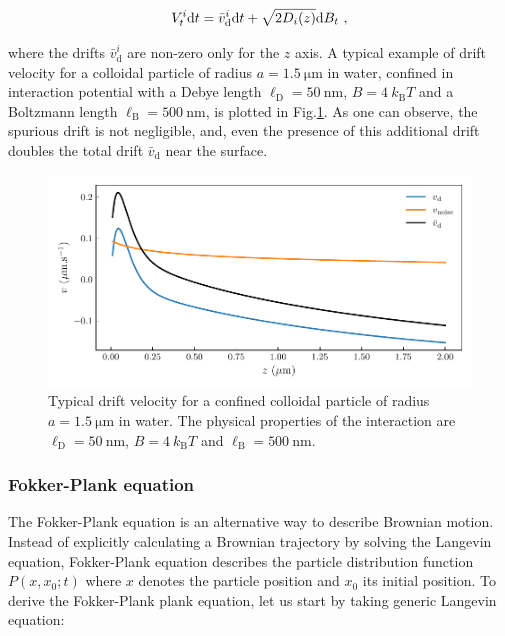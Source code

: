 \begin{equation}
		V_t^i \textnormal{d}t  = \bar{v}_\mathrm{d} ^i \textnormal{d}t + \sqrt{2D_i (z)}  \textnormal{d}B_t ~,
		\label{Eq.langevin_confined}
\end{equation}

where the drifts $\bar{v}_\mathrm{d} ^i $ are non-zero only for the $z$ axis. A typical example of drift velocity for a colloidal particle of radius $a = 1.5 ~\mathrm{\mu m}$ in water, confined in interaction potential with a Debye length $\ell_\mathrm{D} = 50 ~ \mathrm{nm}$, $B = 4 ~k_\mathrm{B}T$ and a Boltzmann length $\ell_\mathrm{B} = 500 ~ \mathrm{nm}$, is plotted in Fig.\ref{fig.spurious}. As one can observe, the spurious drift is not negligible, and, even the presence of this additional drift doubles the total drift $\bar{v}_\mathrm{d}$ near the surface.
\begin{figure}[ht]
	\centering
	\includegraphics{02_body/chapter3/images/spurious_drift/spurious.pdf}
	\caption{Typical drift velocity for a confined colloidal particle of radius $a = 1.5 ~\mathrm{\mu m}$ in water. The physical properties of the interaction are $\ell_\mathrm{D} = 50 ~ \mathrm{nm}$, $B = 4 ~k_\mathrm{B}T$ and $\ell_\mathrm{B} = 500 ~ \mathrm{nm}$.} 
	\label{fig.spurious}
\end{figure}

\subsubsection{Fokker-Plank equation}

The Fokker-Plank equation is an alternative way to describe Brownian motion. Instead of explicitly calculating a Brownian trajectory by solving the Langevin equation, Fokker-Plank equation describes the particle distribution function $P(x, x_0; t)$ where $x$ denotes the particle position and $x_0$ its initial position. To derive the Fokker-Plank plank equation, let us start by taking generic Langevin equation:


